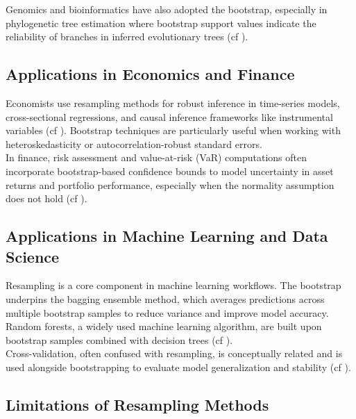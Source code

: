 \documentclass[aodsor,preprint]{imsart}
\numberwithin{equation}{section}
\theoremstyle{plain}
\begin{document}
Genomics and bioinformatics have also adopted the bootstrap, especially in phylogenetic tree estimation where bootstrap support values indicate the reliability of branches in inferred evolutionary trees (cf \cite{davison1997bootstrap,efron1993introduction}). \\

\subsection{Applications in Economics and Finance}

Economists use resampling methods for robust inference in time-series models, cross-sectional regressions, and causal inference frameworks like instrumental variables (cf \cite{davison1997bootstrap,horowitz2001bootstrap}). Bootstrap techniques are particularly useful when working with heteroskedasticity or autocorrelation-robust standard errors. \\

In finance, risk assessment and value-at-risk (VaR) computations often incorporate bootstrap-based confidence bounds to model uncertainty in asset returns and portfolio performance, especially when the normality assumption does not hold (cf \cite{horowitz2001bootstrap,davison1997bootstrap}). \\

\subsection{Applications in Machine Learning and Data Science}

Resampling is a core component in machine learning workflows. The bootstrap underpins the bagging ensemble method, which averages predictions across multiple bootstrap samples to reduce variance and improve model accuracy. Random forests, a widely used machine learning algorithm, are built upon bootstrap samples combined with decision trees (cf \cite{hastie2009elements,efron1993introduction}). \\

Cross-validation, often confused with resampling, is conceptually related and is used alongside bootstrapping to evaluate model generalization and stability (cf \cite{hastie2009elements,davison1997bootstrap}). \\

\subsection{Limitations of Resampling Methods}
\end{document}
